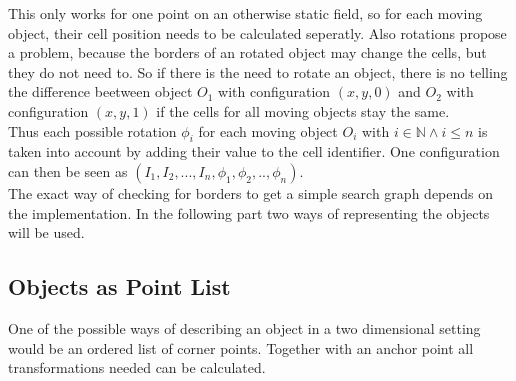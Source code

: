 This only works for one point on an otherwise static field, so for each moving object, their cell position needs to be calculated seperatly. Also rotations propose a problem, because the borders of an rotated object may change the cells, but they do not need to. So if there is the need to rotate an object, there is no telling the difference beetween object $O_1$ with configuration $(x,y,0)$ and $O_2$ with configuration $(x,y,1)$ if the cells for all moving objects stay the same.\\
Thus each possible rotation $\phi_i$ for each moving object $O_i$ with $i \in \mathbb{N} \wedge i \leq n$ is taken into account by adding their value to the cell identifier. One configuration can then be seen as $( I_1 , I_2,...,I_n,\phi_1,\phi_2,..,\phi_n )$.\\
The exact way of checking for borders to get a simple search graph depends on the implementation. In the following part two ways of representing the objects will be used.


\subsection{Objects as Point List}
\label{subsec::pointlist}
One of the possible ways of describing an object in a two dimensional setting would be an ordered list of corner points.  Together with an anchor point all transformations needed can be calculated.
